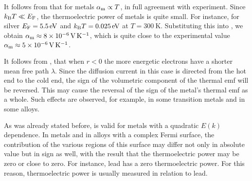 \begin{table}[!b]
	\renewcommand{\arraystretch}{1.2}
	\caption{}
	\vspace{-0.6cm}
	\label{table:9_1}
	\begin{center}\end{center}
\end{table}

It follows from  that for metals $\alpha_{\text{m}}\propto T$, in full agreement with experiment. Since $k_{\text{B}}T\ll E_{\text{F}}$, the thermoelectric power of metals is quite small. For instance, for silver $E_{\text{F}}=\SI{5.5}{\electronvolt}$ and $k_{\text{B}}T=\SI{0.025}{\electronvolt}$ at $T=\SI{300}{\kelvin}$.
Substituting this into , we obtain $\alpha_{\text{m}}\approx\SI{8e-6}{\volt\per\kelvin}$, which is quite close to the experimental value $\alpha_{\text{m}}\approx\SI{5e-6}{\volt\per\kelvin}$.

It follows from , that when $r<0$ the more energetic electrons have a shorter mean free path $\lambda$. Since the diffusion current in this case is directed from the hot end to the cold end, the sign of the volumetric component of the thermal emf will be reversed. This may cause the reversal of the sign of the metal's thermal emf as a whole. Such effects are observed, for example, in some transition metals and in some alloys.

As was already stated before,  is valid for metals with a quadratic $E(k)$ dependence. In metals and in alloys with a complex Fermi surface, the contribution of the various regions of this surface may differ not only in absolute value but in sign as well, with the result that the thermoelectric power may be zero or close to zero. For instance, lead has a zero thermoelectric power. For this reason, thermoelectric power is usually measured in relation to lead.

